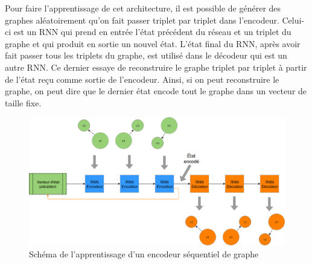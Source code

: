Pour faire l'apprentissage de cet architecture, il est possible de générer des graphes aléatoirement qu'on fait passer triplet par triplet dans l'encodeur. Celui-ci est un RNN qui prend en entrée l'état précédent du réseau et un triplet du graphe et qui produit en sortie un nouvel état. L'état final du RNN, après avoir fait passer tous les triplets du graphe, est utilisé dans le décodeur qui est un autre RNN. Ce dernier essaye de reconstruire le graphe triplet par triplet à partir de l'état reçu comme sortie de l'encodeur. Ainsi, si on peut reconstruire le graphe, on peut dire que le dernier état encode tout le graphe dans un vecteur de taille fixe.
\begin{figure}[H] 
	\centering
	\includegraphics[width=0.8\linewidth]{images/Conception/DM/encoder_seq_train.png}
	\caption{Schéma de l'apprentissage d'un encodeur séquentiel de graphe}
	
\end{figure}\label{encoder_seq_train}
